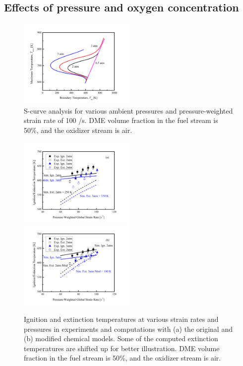 \documentclass[review,3p,times]{elsarticle}
\begin{document}

\subsection{Effects of pressure and oxygen concentration}

\begin{figure}[t]
  \centering
  \scriptsize
  \includegraphics[trim=6.5mm 7.5mm 7mm 8mm, clip=true, width=0.5\textwidth]{eff_P.png}
  \normalsize
  \caption{S-curve analysis for various ambient pressures and pressure-weighted strain rate of 100 /s.  DME volume fraction in the fuel stream is 50\%, and the oxidizer stream is air.}
  \label{fig:eff_P}
\end{figure}

\begin{figure}[t]
  \centering
  \scriptsize
  \includegraphics[trim=6.5mm 7.5mm 7mm 8mm, clip=true, width=0.5\textwidth]{cmp_P.png}
  \includegraphics[trim=6.5mm 7.5mm 7mm 8mm, clip=true, width=0.5\textwidth]{cmp_P_mod.png}
  \normalsize
  \caption{Ignition and extinction temperatures at various strain rates and pressures in experiments and computations with (a) the original and (b) modified chemical models.  Some of the computed extinction temperatures are shifted up for better illustration.  DME volume fraction in the fuel stream is 50\%, and the oxidizer stream is air.}
  \label{fig:cmp_P}
\end{figure}
\end{document}
